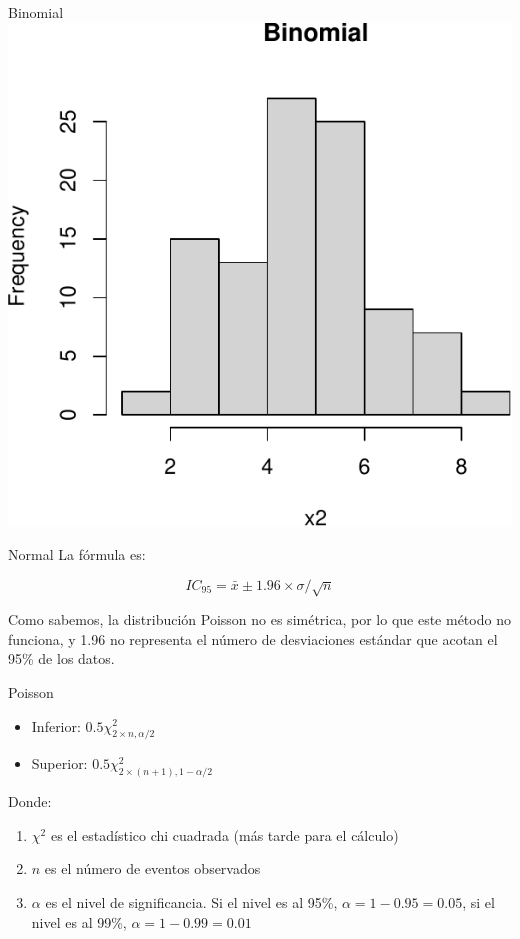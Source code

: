 \documentclass[
  11pt,
  ignorenonframetext,
]{beamer}
\providecommand{\tightlist}{%
  \setlength{\itemsep}{0pt}\setlength{\parskip}{0pt}}
\begin{document}
\begin{frame}{Binomial}
\protect\hypertarget{binomial}{}
\includegraphics{Intervalos-poisson_files/figure-beamer/unnamed-chunk-3-1.pdf}
\end{frame}

\begin{frame}{Normal}
\protect\hypertarget{normal-1}{}
La fórmula es:

\[IC_{95} = \bar{x} \pm 1.96 \times \sigma/\sqrt{n}\]

Como sabemos, la distribución Poisson no es simétrica, por lo que este
método no funciona, y 1.96 no representa el número de desviaciones
estándar que acotan el 95\% de los datos.
\end{frame}

\begin{frame}{Poisson}
\protect\hypertarget{poisson-1}{}
\begin{itemize}
\item
  Inferior: \(0.5 \chi^2_{2 \times n, \alpha/2}\)
\item
  Superior: \(0.5 \chi^2_{2 \times (n+1), 1-\alpha/2}\)
\end{itemize}

Donde:

\begin{enumerate}
\tightlist
\item
  \(\chi^2\) es el estadístico chi cuadrada (más tarde para el cálculo)
\item
  \(n\) es el número de eventos observados
\item
  \(\alpha\) es el nivel de significancia. Si el nivel es al 95\%,
  \(\alpha = 1-0.95 = 0.05\), si el nivel es al 99\%,
  \(\alpha = 1-0.99 = 0.01\)
\end{enumerate}
\end{frame}
\end{document}
